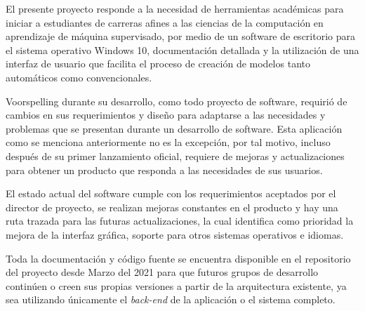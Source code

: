 El presente proyecto responde a la necesidad de herramientas académicas para iniciar a estudiantes de carreras afines a las ciencias de la computación en aprendizaje de máquina supervisado, por medio de un software de escritorio para el sistema operativo Windows 10,  documentación detallada y la utilización de una interfaz de usuario que facilita el proceso de creación de modelos tanto automáticos como convencionales.

Voorspelling durante su desarrollo, como todo proyecto de software, requirió de cambios en sus requerimientos y diseño para adaptarse a las necesidades y problemas que se presentan durante un desarrollo de software. Esta aplicación como se menciona anteriormente no es la excepción, por tal motivo, incluso después de su primer lanzamiento oficial, requiere de mejoras y actualizaciones para obtener un producto que responda a las necesidades de sus usuarios.

El estado actual del software cumple con los requerimientos aceptados por el director de proyecto, se realizan mejoras constantes en el producto y hay una ruta trazada para las futuras actualizaciones, la cual identifica como prioridad la mejora de la interfaz gráfica, soporte para otros sistemas operativos e idiomas.

Toda la documentación y código fuente se encuentra disponible en el repositorio del proyecto desde Marzo del 2021 para que futuros grupos de desarrollo continúen o creen sus propias versiones a partir de la arquitectura existente, ya sea utilizando únicamente el \textit{back-end} de la aplicación o el sistema completo.
 
